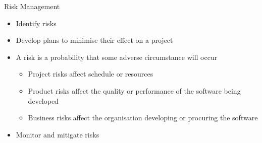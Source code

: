 \documentclass[10pt,t,a4paper]{beamer}
\begin{document}
\begin{frame}[label=sec-1-15]{Risk Management}
\begin{itemize}
\item Identify risks
\item Develop plans to minimise their effect on a project
\item A risk is a probability that some adverse circumstance will occur
\begin{itemize}
\item Project risks affect schedule or resources
\item Product risks affect the quality or performance of the software being developed
\item Business risks affect the organisation developing or procuring the software
\end{itemize}
\item Monitor and mitigate risks
\end{itemize}
\end{frame}
\end{document}
